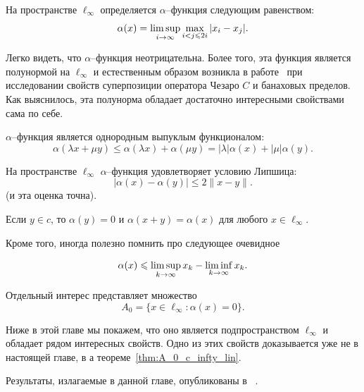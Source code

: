 На пространстве $\ell_\infty$ определяется $\alpha$--функция следующим равенством:
\begin{equation}
	\alpha(x) = \varlimsup_{i\to\infty} \max_{i<j\leqslant 2i} |x_i - x_j|
	.
\end{equation}

Легко видеть, что $\alpha$--функция неотрицательна.
Более того, эта функция является полунормой на $\ell_\infty$
и естественным образом возникла в работе~\cite[\S 2]{semenov2020invariant_noncommutative}
при исследовании свойств суперпозиции оператора Чезаро $C$ и банаховых пределов.
Как выяснилось, эта полунорма обладает достаточно интересными свойствами сама по себе.



	$\alpha$--функция является однородным выпуклым функционалом:
	\begin{equation}
		\alpha(\lambda x+ \mu y)
		\leq
		 \alpha(\lambda x) + \alpha(\mu y) = |\lambda| \alpha(x) + |\mu| \alpha(y)
		.
	\end{equation}



	На пространстве $\ell_\infty$ $\alpha$--функция удовлетворяет условию Липшица:
	\begin{equation}\label{alpha_Lipshitz}
		|\alpha(x) - \alpha(y)| \leq 2 \|x-y\|
		.
	\end{equation}
	(и эта оценка точна).


\begin{property}
	Если $y\in c$, то $\alpha(y) = 0$ и $\alpha(x+y) = \alpha(x)$ для любого $x \in \ell_\infty$.
\end{property}

Кроме того, иногда полезно помнить про следующее очевидное
\begin{property}
	\label{thm:alpha_x_leq_limsup_minus_liminf}
	\begin{equation}
		\alpha(x) \leq \varlimsup_{k\to\infty} x_k - \varliminf_{k\to\infty} x_k
		.
	\end{equation}
\end{property}

Отдельный интерес представляет множество
\begin{equation}
	A_0 = \{x\in\ell_\infty : \alpha(x) = 0\}
	.
\end{equation}

Ниже в этой главе мы покажем, что оно является подпространством $\ell_\infty$ и обладает рядом интересных свойств.
Одно из этих свойств доказывается уже не в настоящей главе, в а теореме~\ref{thm:A_0_c_infty_lin}.

Результаты, излагаемые в данной главе, опубликованы в%
~\cite{
our-mz2019ac0,
our-mz2021linearhulls,
avdeev2021vestnik,
our-ped-2018-alpha-Tx,
our-vzms-2018,
}.
